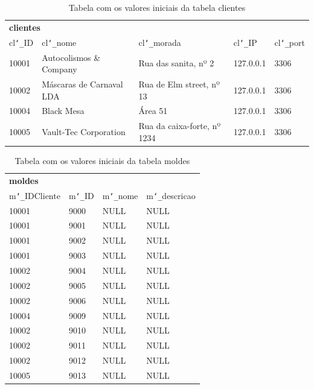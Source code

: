 \documentclass[11pt,twoside,a4paper]{report}
\begin{document}
\begin{table}
	\centering
	\begin{tabular}{|l|l|l|l|l|}
		\multicolumn{5}{l}{\textbf{clientes}}\\ \cline{1-5}
		cl\texttt{\char`_}ID & cl\texttt{\char`_}nome & cl\texttt{\char`_}morada & cl\texttt{\char`_}IP & cl\texttt{\char`_}port\\ \cline{1-5}
		10001 & Autocolismos \& Company & Rua das sanita, nº 2 & 127.0.0.1 & 3306\\ \cline{1-5}
		10002 & Máscaras de Carnaval LDA & Rua de Elm street, nº 13 & 127.0.0.1 & 3306\\ \cline{1-5}
		10004 & Black Mesa & Área 51 & 127.0.0.1 & 3306\\ \cline{1-5}
		10005 & Vault-Tec Corporation & Rua da caixa-forte, nº 1234 & 127.0.0.1 & 3306\\ \cline{1-5}
	\end{tabular}
	\caption[Tabela com os valores iniciais da tabela clientes]{Tabela com os valores iniciais da tabela clientes}
	\label{tab:dados3}
\end{table}
\begin{table}
	\centering
	\begin{tabular}{|l|l|l|l|}
		\multicolumn{4}{l}{\textbf{moldes}}\\ \cline{1-4}
		m\texttt{\char`_}IDCliente & m\texttt{\char`_}ID & 
		m\texttt{\char`_}nome & 
		m\texttt{\char`_}descricao\\ \cline{1-4}
		10001 & 9000 & NULL & NULL\\ \cline{1-4}
		10001 & 9001 & NULL & NULL\\ \cline{1-4}
		10001 & 9002 & NULL & NULL\\ \cline{1-4}
		10001 & 9003 & NULL & NULL\\ \cline{1-4}
		10002 & 9004 & NULL & NULL\\ \cline{1-4}
		10002 & 9005 & NULL & NULL\\ \cline{1-4}
		10002 & 9006 & NULL & NULL\\ \cline{1-4}
		10004 & 9009 & NULL & NULL\\ \cline{1-4}
		10002 & 9010 & NULL & NULL\\ \cline{1-4}
		10002 & 9011 & NULL & NULL\\ \cline{1-4}
		10002 & 9012 & NULL & NULL\\ \cline{1-4}
		10005 & 9013 & NULL & NULL\\ \cline{1-4}
	\end{tabular}
	\caption[Tabela com os valores iniciais da tabela moldes]{Tabela com os valores iniciais da tabela moldes}
	\label{tab:dados4}
\end{table}
\end{document}
